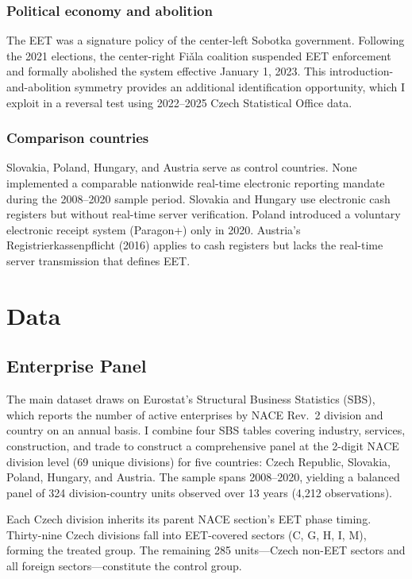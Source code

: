 \documentclass[12pt]{article}
\begin{document}
\subsubsection*{Political economy and abolition} The EET was a signature policy of the center-left Sobotka government. Following the 2021 elections, the center-right Fi\v{a}la coalition suspended EET enforcement and formally abolished the system effective January 1, 2023. This introduction-and-abolition symmetry provides an additional identification opportunity, which I exploit in a reversal test using 2022--2025 Czech Statistical Office data.

\subsubsection*{Comparison countries} Slovakia, Poland, Hungary, and Austria serve as control countries. None implemented a comparable nationwide real-time electronic reporting mandate during the 2008--2020 sample period. Slovakia and Hungary use electronic cash registers but without real-time server verification. Poland introduced a voluntary electronic receipt system (Paragon+) only in 2020. Austria's Registrierkassenpflicht (2016) applies to cash registers but lacks the real-time server transmission that defines EET.


\section{Data}

\subsection{Enterprise Panel}

The main dataset draws on Eurostat's Structural Business Statistics (SBS), which reports the number of active enterprises by NACE Rev.\ 2 division and country on an annual basis. I combine four SBS tables covering industry, services, construction, and trade to construct a comprehensive panel at the 2-digit NACE division level (69 unique divisions) for five countries: Czech Republic, Slovakia, Poland, Hungary, and Austria. The sample spans 2008--2020, yielding a balanced panel of 324 division-country units observed over 13 years (4,212 observations).

Each Czech division inherits its parent NACE section's EET phase timing. Thirty-nine Czech divisions fall into EET-covered sectors (C, G, H, I, M), forming the treated group. The remaining 285 units---Czech non-EET sectors and all foreign sectors---constitute the control group.
\end{document}

